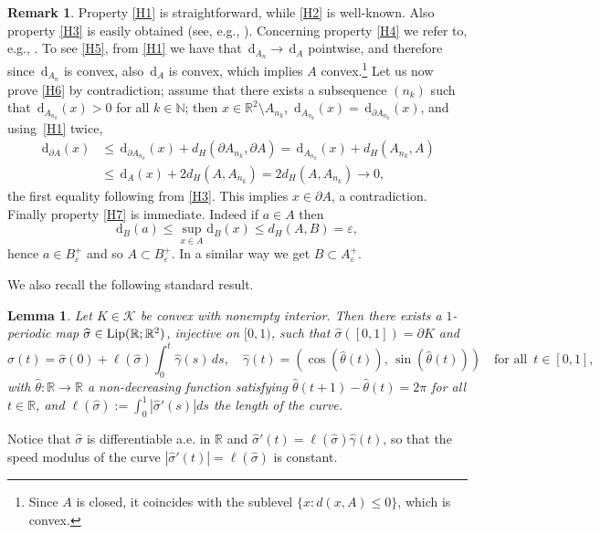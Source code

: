 \documentclass[JEP,XML,SOM,Unicode, NoFloatCountersInSection,published]{cedram}
\newcommand{\R}{\mathbb{R}}
\let\eps\varepsilon
\let\len\ell
\newcommand{\di}{\,\mathrm{d}}
\newtheorem{lemma}[theorem]{Lemma}
\theoremstyle{definition}
\newtheorem{remark}[theorem]{Remark}
\begin{document}
\begin{remark}
Property \ref{H1} is straightforward, while \ref{H2} is well-known. Also property \ref{H3} is easily obtained (see, e.g., \cite{W}).
Concerning property \ref{H4} we refer to, e.g., \cite[Cor.\,2]{AF}.
To see \ref{H5}, from \ref{H1} we have that $\di_{A_n} \to \di_A$ pointwise,
and therefore since $\di_{A_n}$ is convex, also $\di_A$ is convex, which implies $A$ convex.\footnote{Since $A$ is closed, it
coincides with the sublevel $\{x:d(x,A)\leq 0\}$, which is convex.}
Let us now prove \ref{H6} by contradiction;
assume that there exists a subsequence $(n_k)$ such that $\di_{A_{n_k}}(x)>0$
for all $k\in \mathbb N$; then $x\in \R^2\setminus A_{n_k}$,
$\di_{A_{n_k}}(x)=\di_{\partial A_{n_k}}(x) $, and using~\ref{H1} twice,
\begin{align*}
\di_{\partial A}(x)&\leq \di_{\partial A_{n_k}}(x)+
d_H(\partial A_{n_k},\partial A)=\di_{A_{n_k}}(x)+d_H( A_{n_k},A)\\
&\leq \di_A(x)+ 2d_H(A, A_{n_k})=2d_H(A, A_{n_k})\to0,
\end{align*}
the first equality following from \ref{H3}.
This implies $x\in \partial A$, a contradiction. Finally property \ref{H7} is immediate. Indeed if $a\in A$ then
\begin{equation*}
\mathrm{d}_B(a)\le \sup_{x\in A} \mathrm{d}_B(x)\le d_H(A,B)=\eps,
\end{equation*}
hence $a\in B_\eps^+$ and so $A\subset B_\eps^+$. In a similar way we get $B\subset A_\eps^+$.
\end{remark}

We also recall the following standard result.

\begin{lemma}\label{lm:charact_convex_sets}
Let $K\in\mathcal K$ be convex with nonempty interior.
Then there exists a $1$-periodic map $\widehat \sigma\in {\rm{Lip}}(\mathbb R;\R^2)$, injective on $[0,1)$, such that $\widehat \sigma([0,1])=\partial K$ and
\begin{equation*}
\widehat\sigma(t)=\widehat \sigma(0)+\len(\widehat\sigma)\int_0^t\widehat \gamma(s)\,ds,\quad \widehat\gamma(t)=(\cos(\widehat\theta(t)),\,\sin(\widehat\theta(t)))\quad \text{for all }\, t\in[0,1],
\end{equation*}
with $\widehat \theta\colon\R\to\R$ a non-decreasing function satisfying $\widehat \theta(t+1)-\widehat \theta(t)=2\pi$ for all $t\in\R$, and
$\len(\widehat\sigma):=\int_0^1|\widehat \sigma'(s)|ds$ the length of the curve.
\end{lemma}
Notice that $\widehat \sigma$ is differentiable a.e. in $\mathbb R$ and $\widehat \sigma'(t)=\len(\widehat\sigma)\widehat \gamma(t)$, so that the speed modulus of the curve
$|\hat\sigma'(t)|=\len(\widehat\sigma)$ is constant.
\end{document}
